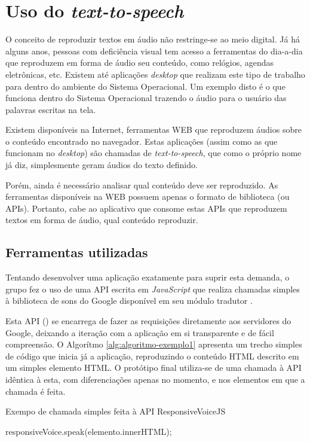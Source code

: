 \documentclass[
	12pt,				%
	oneside,			%
	a4paper,			%
	english,			%
	brazil				%
	]{abntex2ppgsi}
\begin{document}
\section{Uso do \textit{text-to-speech}}

O conceito de reproduzir textos em áudio não restringe-se ao meio digital. Já há alguns anos, pessoas com deficiência visual tem acesso a ferramentas do dia-a-dia que reproduzem em forma de áudio seu conteúdo, como relógios, agendas eletrônicas, etc. Existem até aplicações \textit{desktop} que realizam este tipo de trabalho para dentro do ambiente do Sistema Operacional. Um exemplo disto é o  que funciona dentro do Sistema Operacional trazendo o áudio para o usuário das palavras escritas na tela. 

Existem disponíveis na Internet, ferramentas WEB que reproduzem áudios sobre o conteúdo encontrado no navegador. Estas aplicações (assim como as que funcionam no \textit{desktop}) são chamadas de \textit{text-to-speech}, que como o próprio nome já diz, simplesmente geram áudios do texto definido.

Porém, ainda é necessário analisar qual conteúdo deve ser reproduzido. As ferramentas disponíveis na WEB possuem apenas o formato de biblioteca (ou APIs). Portanto, cabe ao aplicativo que consome estas APIs que reproduzem textos em forma de áudio, qual conteúdo reproduzir.

\subsection{Ferramentas utilizadas}

Tentando desenvolver uma aplicação exatamente para suprir esta demanda, o grupo fez o uso de uma API escrita em \textit{JavaScript} que realiza chamadas simples à biblioteca de sons do Google disponível em seu módulo tradutor \cite{googleTranslate}.

Esta API () se encarrega de fazer as requisições diretamente aos servidores do Google, deixando a iteração com a aplicação em si transparente e de fácil compreensão. O Algorítmo  \ref{alg:algoritmo-exemplo1} apresenta um trecho simples de código que inicia já a aplicação, reproduzindo o conteúdo HTML descrito em um simples elemento HTML. O protótipo final utiliza-se de uma chamada à API idêntica à esta, com diferenciações apenas no momento, e nos elementos em que a chamada é feita.

\begin{algorithm}[htbp]
	\caption{Exempo de chamada simples feita à API ResponsiveVoiceJS}
	\label{alg:algoritmo-exemplo1}
	\begin{algorithmic}
		\State responsiveVoice.speak(elemento.innerHTML);
		\EndFunction
	\end{algorithmic}
\end{algorithm}
\end{document}
